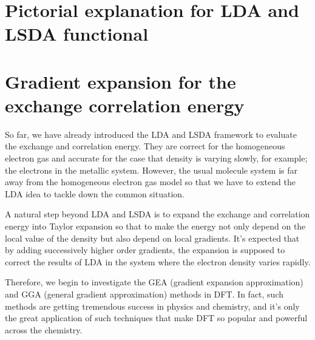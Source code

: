 \section{Pictorial explanation for LDA and LSDA functional}
\label{sec:Pictorial_for_LDA}
%
%
%
%



\section{Gradient expansion for the exchange correlation energy}
\label{sec:GE_in_functional}
%
%
%
%
So far, we have already introduced the LDA and LSDA framework to
evaluate the exchange and correlation energy. They are correct for the
homogeneous electron gas and accurate for the case that density is
varying slowly, for example; the electrons in the metallic
system. However, the usual molecule system is far away from the
homogeneous electron gas model so that we have to extend the LDA idea
to tackle down the common situation. 

A natural step beyond LDA and LSDA is to expand the exchange and
correlation energy into Taylor expansion so that to make the energy
not only depend on the local value of the density but also depend on
local gradients. It's expected that by adding successively
higher order gradients, the expansion is supposed to correct the
results of LDA in the system where the electron density varies
rapidly. 

Therefore, we begin to investigate the GEA (gradient expansion
approximation) and GGA (general gradient approximation) methods in
DFT. In fact, such methods are getting tremendous success in physics
and chemistry, and it's only the great application of such techniques
that make DFT so popular and powerful across the chemistry.


